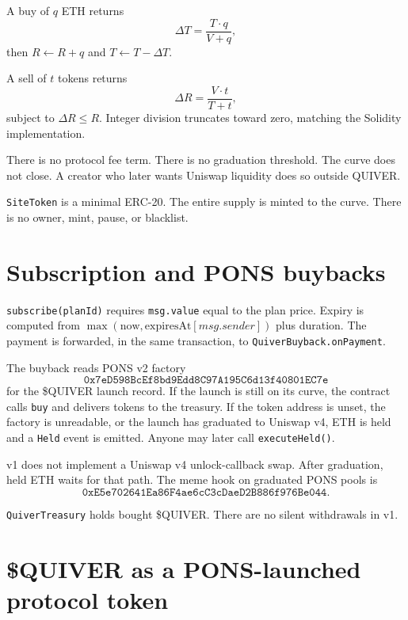 \documentclass[11pt,a4paper]{article}
\begin{document}
A buy of $q$ ETH returns
\begin{equation}
  \Delta T = \frac{T \cdot q}{V + q},
\end{equation}
then $R \leftarrow R + q$ and $T \leftarrow T - \Delta T$.

A sell of $t$ tokens returns
\begin{equation}
  \Delta R = \frac{V \cdot t}{T + t},
\end{equation}
subject to $\Delta R \le R$. Integer division truncates toward zero, matching the Solidity implementation.

There is no protocol fee term. There is no graduation threshold. The curve does not close. A creator who later wants Uniswap liquidity does so outside QUIVER.

\texttt{SiteToken} is a minimal ERC-20. The entire supply is minted to the curve. There is no owner, mint, pause, or blacklist.

\section{Subscription and PONS buybacks}

\texttt{subscribe(planId)} requires \texttt{msg.value} equal to the plan price. Expiry is computed from $\max(\mathrm{now}, \mathrm{expiresAt}[msg.sender])$ plus duration. The payment is forwarded, in the same transaction, to \texttt{QuiverBuyback.onPayment}.

The buyback reads PONS v2 factory
\[
\texttt{0x7eD598BcEf8bd9Edd8C97A195C6d13f40801EC7e}
\]
for the \$QUIVER launch record. If the launch is still on its curve, the contract calls \texttt{buy} and delivers tokens to the treasury. If the token address is unset, the factory is unreadable, or the launch has graduated to Uniswap v4, ETH is held and a \texttt{Held} event is emitted. Anyone may later call \texttt{executeHeld()}.

v1 does not implement a Uniswap v4 unlock-callback swap. After graduation, held ETH waits for that path. The meme hook on graduated PONS pools is
\[
\texttt{0xE5e702641Ea86F4ae6cC3cDaeD2B886f976Be044}.
\]

\texttt{QuiverTreasury} holds bought \$QUIVER. There are no silent withdrawals in v1.

\section{\$QUIVER as a PONS-launched protocol token}
\end{document}
